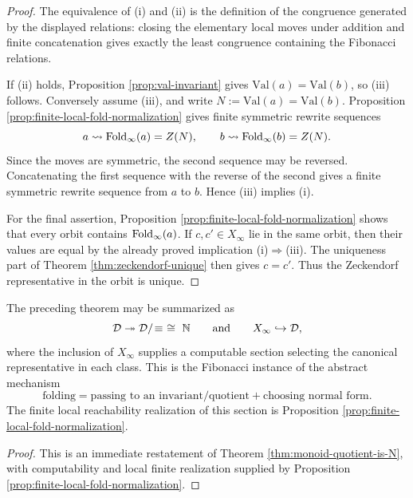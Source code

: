 \begin{proof}
The equivalence of (i) and (ii) is the definition of the congruence generated by the displayed relations: closing the elementary local moves under addition and finite concatenation gives exactly the least congruence containing the Fibonacci relations.

If (ii) holds, Proposition \ref{prop:val-invariant} gives \(\mathrm{Val}(a)=\mathrm{Val}(b)\), so (iii) follows. Conversely assume (iii), and write \(N:=\mathrm{Val}(a)=\mathrm{Val}(b)\). Proposition \ref{prop:finite-local-fold-normalization} gives finite symmetric rewrite sequences
\[
a\rightsquigarrow \operatorname{Fold}_\infty(a)=Z(N),
\qquad
b\rightsquigarrow \operatorname{Fold}_\infty(b)=Z(N).
\]
Since the moves are symmetric, the second sequence may be reversed. Concatenating the first sequence with the reverse of the second gives a finite symmetric rewrite sequence from \(a\) to \(b\). Hence (iii) implies (i).

For the final assertion, Proposition \ref{prop:finite-local-fold-normalization} shows that every orbit contains \(\operatorname{Fold}_\infty(a)\). If \(c,c'\in X_\infty\) lie in the same orbit, then their values are equal by the already proved implication (i)\(\Rightarrow\)(iii). The uniqueness part of Theorem \ref{thm:zeckendorf-unique} then gives \(c=c'\). Thus the Zeckendorf representative in the orbit is unique.
\end{proof}

\begin{corollary}\label{cor:fold-as-section}
The preceding theorem may be summarized as
\[
\mathcal{D}\twoheadrightarrow \mathcal{D}/\!\equiv\ \cong\ \mathbb{N}
\qquad\text{and}\qquad
X_\infty\hookrightarrow \mathcal{D},
\]
where the inclusion of \(X_\infty\) supplies a computable section selecting the canonical representative in each class. This is the Fibonacci instance of the abstract mechanism
\[
\text{folding}=\text{passing to an invariant/quotient}+\text{choosing normal form}.
\]
The finite local reachability realization of this section is Proposition \ref{prop:finite-local-fold-normalization}.
\end{corollary}

\begin{proof}
This is an immediate restatement of Theorem \ref{thm:monoid-quotient-is-N}, with computability and local finite realization supplied by Proposition \ref{prop:finite-local-fold-normalization}.
\end{proof}

